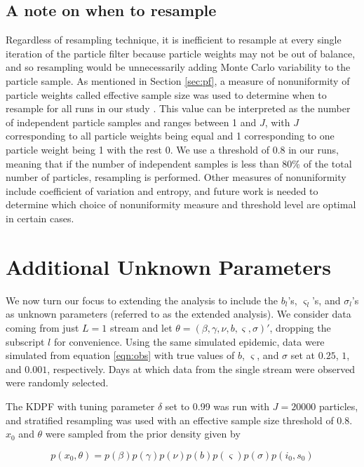 \documentclass{elsarticle}
\begin{document}
\subsection{A note on when to resample}

Regardless of resampling technique, it is inefficient to resample at every single iteration of the particle filter because particle weights may not be out of balance, and so resampling would be unnecessarily adding Monte Carlo variability to the particle sample.  As mentioned in Section \ref{sec:pf}, a measure of nonuniformity of particle weights called effective sample size was used to determine when to resample for all runs in our study \citep{Liu:Chen:Wong:reje:1998}.  This value can be interpreted as the number of independent particle samples and ranges between 1 and $J$, with $J$ corresponding to all particle weights being equal and 1 corresponding to one particle weight being 1 with the rest 0.  We use a threshold of 0.8 in our runs, meaning that if the number of independent samples is less than 80\% of the total number of particles, resampling is performed.  Other measures of nonuniformity include coefficient of variation and entropy, and future work is needed to determine which choice of nonuniformity measure and threshold level are optimal in certain cases.

\section{Additional Unknown Parameters \label{sec:extend}}

We now turn our focus to extending the analysis to include the $b_l$'s, $\varsigma_l$'s, and $\sigma_l$'s as unknown parameters (referred to as the extended analysis).  We consider data coming from just $L = 1$ stream and let $\theta = (\beta, \gamma, \nu, b, \varsigma, \sigma)'$, dropping the subscript $l$ for convenience.  Using the same simulated epidemic, data were simulated from equation \eqref{eqn:obs} with true values of $b$, $\varsigma$, and $\sigma$ set at $0.25$, $1$, and $0.001$, respectively.  Days at which data from the single stream were observed were randomly selected.

The KDPF with tuning parameter $\delta$ set to 0.99 was run with $J = 20000$ particles, and stratified resampling was used with an effective sample size threshold of 0.8.  $x_0$ and $\theta$ were sampled from the prior density given by

\[p\left(x_0,\theta\right) = p\left(\beta\right)p\left(\gamma\right)p\left(\nu\right)p\left(b\right)p\left(\varsigma\right)p\left(\sigma\right)p\left(i_0,s_0\right)\]
\end{document}
